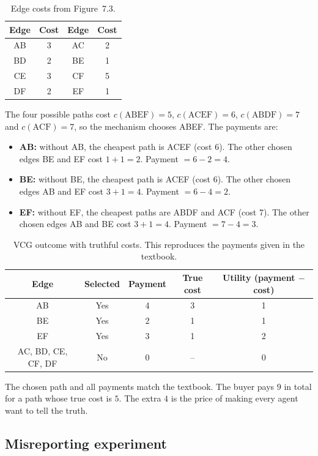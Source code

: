 \documentclass[11pt,a4paper]{article}
\begin{document}
\begin{table}[H]
\centering
\caption{Edge costs from Figure~7.3.}
\label{tab:edges}
\begin{tabular}{cccc}
\toprule
Edge & Cost & Edge & Cost\\
\midrule
AB & 3 & AC & 2\\
BD & 2 & BE & 1\\
CE & 3 & CF & 5\\
DF & 2 & EF & 1\\
\bottomrule
\end{tabular}
\end{table}

The four possible paths cost $c(\text{ABEF})=5$, $c(\text{ACEF})=6$, $c(\text{ABDF})=7$ and $c(\text{ACF})=7$, so the mechanism chooses ABEF. The payments are:
\begin{itemize}
  \item \textbf{AB:} without AB, the cheapest path is ACEF (cost 6). The other chosen edges BE and EF cost $1+1=2$. Payment $=6-2=4$.
  \item \textbf{BE:} without BE, the cheapest path is ACEF (cost 6). The other chosen edges AB and EF cost $3+1=4$. Payment $=6-4=2$.
  \item \textbf{EF:} without EF, the cheapest paths are ABDF and ACF (cost 7). The other chosen edges AB and BE cost $3+1=4$. Payment $=7-4=3$.
\end{itemize}

\begin{table}[H]
\centering
\caption{VCG outcome with truthful costs. This reproduces the payments given in the textbook.}
\label{tab:vcg}
\begin{tabular}{ccccc}
\toprule
Edge & Selected & Payment & True cost & Utility (payment $-$ cost)\\
\midrule
AB & Yes & 4 & 3 & 1\\
BE & Yes & 2 & 1 & 1\\
EF & Yes & 3 & 1 & 2\\
AC, BD, CE, CF, DF & No & 0 & -- & 0\\
\bottomrule
\end{tabular}
\end{table}

The chosen path and all payments match the textbook. The buyer pays $9$ in total for a path whose true cost is $5$. The extra $4$ is the price of making every agent want to tell the truth.

\subsection{Misreporting experiment}
\end{document}
